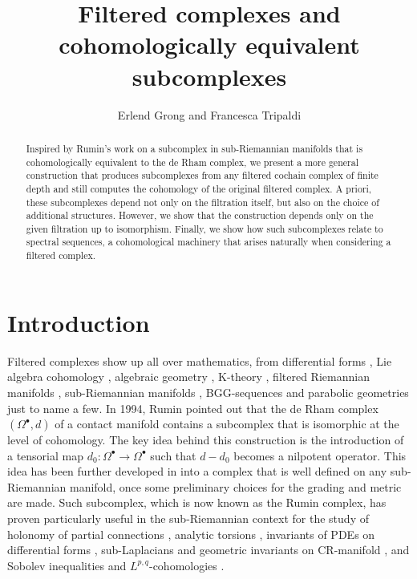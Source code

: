 \documentclass[10pt]{amsart}
\title[Filtered complexes and cohomologically equivalent subcomplexes]{Filtered complexes and cohomologically equivalent subcomplexes}
\author[E.~Grong and F.~Tripaldi]{Erlend Grong and Francesca Tripaldi}
\theoremstyle{remark}
\numberwithin{equation}{section}
\begin{document}
\begin{abstract}
Inspired by Rumin's work on a subcomplex in sub-Riemannian manifolds that is cohomologically equivalent to the de Rham complex, we present a more general construction that produces subcomplexes from any filtered cochain complex of finite depth and still computes the cohomology of the original filtered complex. A priori, these subcomplexes depend not only on the filtration itself, but also on the choice of additional structures. However, we show that the construction depends only on the given filtration up to isomorphism. Finally, we show how such subcomplexes relate to spectral sequences, a cohomological machinery that arises naturally when considering a filtered complex. 
\end{abstract}

\maketitle

\section{Introduction} \label{sec:Introduction}
Filtered complexes show up all over mathematics, from differential forms \cite{Hat60,BotTu82}, Lie algebra cohomology \cite{HoSe53}, algebraic geometry \cite{Abd00}, K-theory \cite{Bloch77}, filtered Riemannian manifolds \cite{Sak78,Alv89}, sub-Riemannian manifolds \cite{Rumin1,Rumin2,Rumin4}, BGG-sequences \cite{CSS01,dave2020heat,DaHa22} and parabolic geometries \cite{CaSl09} just to name a few. In 1994, Rumin \cite{Rumin1,Pan93} pointed out that the de Rham complex $(\Omega^\bullet,d)$ of a contact manifold contains a subcomplex that is isomorphic at the level of cohomology. The key idea behind this construction is the introduction of a tensorial map $d_0\colon\Omega^\bullet\to\Omega^\bullet$ such that $d-d_0$ becomes a nilpotent operator. This idea has been further developed in \cite{Rumin2,Rumin3,Rumin4} into a complex that is well defined on any sub-Riemannian manifold, once some preliminary choices for the grading and metric are made. Such subcomplex, which is now known as the Rumin complex, has proven particularly useful in the sub-Riemannian context for the study of holonomy of partial connections \cite{FGR97,GrPa18,CGJK19}, analytic torsions \cite{RuSe12,Kit20,Hall22}, invariants of PDEs on differential forms \cite{Rumin4,AlQu22,dave2020heat}, sub-Laplacians and geometric invariants on CR-manifold \cite{AGL02,BHR07}, and Sobolev inequalities and $L^{p,q}$-cohomologies \cite{BFT06,PaRu18,PaTr19,BTT22,BFP22}.
\end{document}
